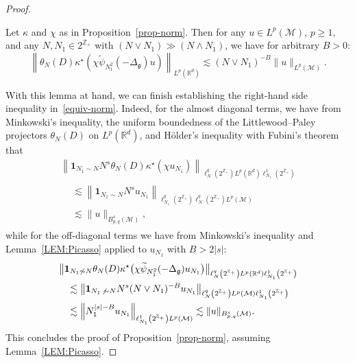 \documentclass[AHL,Unicode,longabstracts,published]{cedram}
\newcommand{\Z}{\mathbb{Z}}
\newcommand{\R}{\mathbb{R}}
\newcommand{\ind}{\mathbf{1}}
\newcommand{\M}{\mathcal{M}}
\newcommand{\g}{\mathfrak{g}}
\newcommand{\Dlg}{\Delta_{\g}}
\newcommand{\kk}{\kappa}
\newcommand{\les}{\lesssim}
\begin{document}
\begin{proof}
\begin{lemm}\label{LEM:Picasso}
Let $\kk$ and $\chi$ as in Proposition~\ref{prop-norm}. Then for any $u\in L^p(\M)$, $p\geq 1$, and any $N,N_1\in 2^{\Z_+}$ with $(N\vee N_1)\gg (N\wedge N_1)$, we have for arbitrary $B>0$:
\begin{equation}\label{estim-key-norm}
\left\|\theta_N(D)\kk^{\star}\left(\chi\widetilde{\psi}_{N_1^2}(-\Dlg)u\right)\right\|_{L^p(\R^d)}\les (N\vee N_1)^{-B}\|u\|_{L^p(\M)}.
\end{equation}
\end{lemm}

With this lemma at hand, we can finish establishing the right-hand side inequality in~\eqref{equiv-norm}. Indeed, for the almost diagonal terms, we have from Minkowski's inequality, the uniform boundedness of the Littlewood--Paley projectors $\theta_N(D)$ on $L^p(\R^d)$, and H\"older's inequality with Fubini's theorem that
\begin{multline*}
\left\|\ind_{N_1\sim N}N^s\theta_N(D)\kk^\star(\chi u_{N_1})\right\|_{\ell^q_N\left(2^{\Z_+}\right) L^p\left(\R^d\right)\ell^1_{N_1}\left(2^{\Z_+}\right)}\\
\begin{aligned}
&\les \left\|\ind_{N_1\sim N}N^s u_{N_1}\right\|_{\ell^q_{N_1}\left(2^{\Z_+}\right)\ell^q_{N}\left(2^{\Z_+}\right) L^p(\M)}\\
&\les \|u\|_{B^s_{p,q}(\M)},
\end{aligned}
\end{multline*}
while for the off-diagonal terms we have from Minkowski's inequality and Lemma~\ref{LEM:Picasso} applied to $u_{N_1}$ with $B>2|s|$:
\begin{multline*}
\big\|\ind_{N_1\not\sim N}\theta_N(D)\kk^{\star}\big(\chi\widetilde{\psi}_{N_1^2}(-\Dlg)u_{N_1}\big)\big\|_{\ell^q_N\left(2^{\Z_+}\right)L^p(\R^d)\ell^1_{N_1}\left(2^{\Z_+}\right)}\\
\begin{aligned}
&\les \left\|\ind_{N_1\,\not\,\sim N}N^s(N\vee N_1)^{-B}u_{N_1}\right\|_{\ell^q_{N}\left(2^{\Z_+}\right)L^p(\M)\ell^1_{N_1}\left(2^{\Z_+}\right)}\\
&\les \left\|N_1^{|s|-B}u_{N_1}\right\|_{\ell^1_{N_1}\left(2^{\Z_+}\right)L^p(\M)} \les \|u\|_{B^s_{p,q}(\M)}.
\end{aligned}
\end{multline*}
This concludes the proof of Proposition~\ref{prop-norm}, assuming Lemma~\ref{LEM:Picasso}.
\end{proof}
\end{document}
